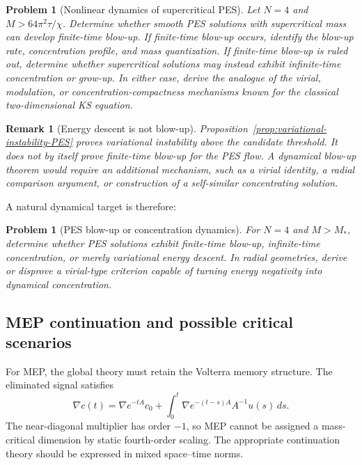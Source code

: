 \documentclass[pdflatex,sn-mathphys-num]{sn-jnl}%
\theoremstyle{thmstyleone}
\theoremstyle{thmstyletwo}
\newtheorem{remark}{Remark}
\newtheorem{problem}[theorem]{Problem}
\theoremstyle{thmstylethree}
\begin{document}
\begin{problem}[Nonlinear dynamics of supercritical PES]
\label{prob:supercritical-PES-dynamics}
Let \(N=4\) and \(M>64\pi^2\tau/\chi\).  Determine whether smooth PES
solutions with supercritical mass can develop finite-time blow-up.  If
finite-time blow-up occurs, identify the blow-up rate, concentration profile,
and mass quantization.  If finite-time blow-up is ruled out, determine whether
supercritical solutions may instead exhibit infinite-time concentration or
grow-up.  In either case, derive the analogue of the virial, modulation, or
concentration-compactness mechanisms known for the classical two-dimensional
KS equation.
\end{problem}

\begin{remark}[Energy descent is not blow-up]
\label{rem:energy-not-blowup}
Proposition~\ref{prop:variational-instability-PES} proves variational instability above the candidate threshold.  It does not by itself prove finite-time blow-up for the PES flow.  A dynamical blow-up theorem would require an additional mechanism, such as a virial identity, a radial comparison argument, or construction of a self-similar concentrating solution.
\end{remark}

A natural dynamical target is therefore:

\begin{problem}[PES blow-up or concentration dynamics]
\label{prob:PES-dynamics}
For \(N=4\) and \(M>M_*\), determine whether PES solutions exhibit finite-time blow-up, infinite-time concentration, or merely variational energy descent.  In radial geometries, derive or disprove a virial-type criterion capable of turning energy negativity into dynamical concentration.
\end{problem}

\subsection{MEP continuation and possible critical scenarios}

For MEP, the global theory must retain the Volterra memory structure.  The eliminated signal satisfies
\[
        \nabla c(t)=\nabla e^{-tA}c_0+\int_0^t\nabla e^{-(t-s)A}A^{-1}u(s)\,ds.
\]
The near-diagonal multiplier has order \(-1\), so MEP cannot be assigned a mass-critical dimension by static fourth-order scaling.  The appropriate continuation theory should be expressed in mixed space--time norms.
\end{document}
